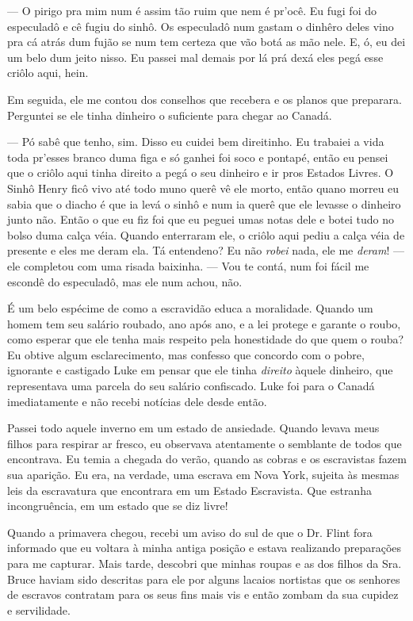 --- O pirigo pra mim num é assim tão
ruim que nem é pr'ocê. Eu fugi foi do especuladô e cê fugiu do sinhô. Os
especuladô num gastam o dinhêro deles vino pra cá atrás dum fujão se num
tem certeza que vão botá as mão nele. E, ó, eu dei um belo dum jeito
nisso. Eu passei mal demais por lá prá dexá eles pegá esse criôlo aqui,
hein.

Em seguida, ele me contou dos conselhos
que recebera e os planos que preparara. Perguntei se ele tinha dinheiro
o suficiente para chegar ao Canadá.

--- Pó sabê que tenho, sim. Disso eu cuidei bem direitinho. Eu trabaiei
a vida toda pr'esses branco duma figa e só ganhei foi soco e pontapé,
então eu pensei que o criôlo aqui tinha direito a pegá o seu dinheiro e
ir pros Estados Livres. O Sinhô Henry ficô vivo até todo muno querê vê
ele morto, então quano morreu eu sabia que o diacho é que ia levá o
sinhô e num ia querê que ele levasse o dinheiro junto não. Então o que
eu fiz foi que eu peguei umas notas dele e botei tudo no bolso duma
calça véia. Quando enterraram ele, o criôlo aqui pediu a calça véia de
presente e eles me deram ela. Tá entendeno? Eu não \emph{robei} nada,
ele me \emph{deram}! --- ele completou com uma risada baixinha. --- Vou
te contá, num foi fácil me escondê do especuladô, mas ele num achou,
não.

É um belo espécime de como a escravidão
educa a moralidade. Quando um homem tem seu salário roubado, ano após
ano, e a lei protege e garante o roubo, como esperar que ele tenha mais
respeito pela honestidade do que quem o rouba? Eu obtive algum
esclarecimento, mas confesso que concordo com o pobre, ignorante e
castigado Luke em pensar que ele tinha \emph{direito} àquele dinheiro,
que representava uma parcela do seu salário confiscado. Luke foi para o
Canadá imediatamente e não recebi notícias dele desde então.

Passei todo aquele inverno em um estado
de ansiedade. Quando levava meus filhos para respirar ar fresco, eu
observava atentamente o semblante de todos que encontrava. Eu temia a
chegada do verão, quando as cobras e os escravistas fazem sua aparição.
Eu era, na verdade, uma escrava em
Nova York, sujeita às mesmas leis da escravatura que encontrara em um
Estado Escravista. Que estranha incongruência, em um estado que se diz
livre!

Quando a primavera chegou, recebi um
aviso do sul de que o Dr. Flint fora informado que eu voltara à minha
antiga posição e estava realizando preparações para me capturar. Mais
tarde, descobri que minhas roupas e as dos filhos da Sra. Bruce haviam
sido descritas para ele por alguns lacaios nortistas que os senhores de
escravos contratam para os seus fins mais vis e então zombam da sua
cupidez e servilidade.

